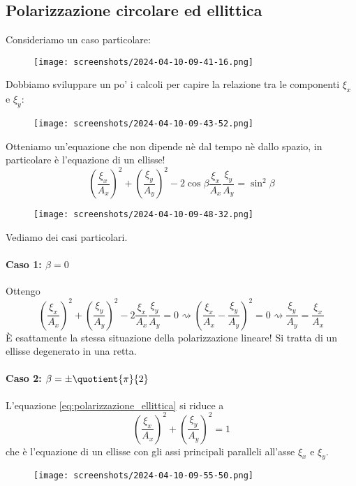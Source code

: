 \subsection{Polarizzazione circolare ed ellittica}
Consideriamo un caso particolare:
\begin{figure}[H]
	\centering
	\texttt{[image: screenshots/2024-04-10-09-41-16.png]}
\end{figure}
Dobbiamo sviluppare un po' i calcoli per capire la relazione tra le componenti \(\xi _x\) e \(\xi _y\):
\begin{figure}[H]
	\centering
	\texttt{[image: screenshots/2024-04-10-09-43-52.png]}
\end{figure}
Otteniamo un'equazione che non dipende nè dal tempo nè dallo spazio, in particolare è l'equazione di un ellisse!
\begin{equation}\label{eq:polarizzazione_ellittica}
	\left( \frac{\xi _x}{A_x} \right)^{2} +\left( \frac{\xi _y}{A_y} \right)^{2} -2 \cos \beta \frac{\xi _x}{A_x} \frac{\xi _y}{A_y} = \sin ^{2} \beta   
\end{equation}
\begin{figure}[H]
	\centering
	\texttt{[image: screenshots/2024-04-10-09-48-32.png]}
\end{figure}
Vediamo dei casi particolari.

\paragraph{Caso 1: \(\beta =0\)}
Ottengo
\begin{equation}
	\left( \frac{\xi _x}{A_x} \right)^{2} + \left( \frac{\xi _y}{A_y} \right)^{2} -2 \frac{\xi _x}{A_x}\frac{\xi _y}{A_y}=0 \rightsquigarrow 
	\left( \frac{\xi _x}{A_x}- \frac{\xi _y}{A_y} \right)^{2} =0 \rightsquigarrow 
	\frac{\xi _y}{A_y}=\frac{\xi _x}{A_x}   
\end{equation}
È esattamente la stessa situazione della polarizzazione lineare! Si tratta di un ellisse degenerato in una retta.

\paragraph{Caso 2: \(\beta = \pm \quotient{\pi }{2} \)}
L'equazione \eqref{eq:polarizzazione_ellittica} si riduce a
\begin{equation}
	\left( \frac{\xi _x}{A_x} \right)^{2} + \left( \frac{\xi _y}{A_y} \right)^{2} =1  
\end{equation} 
che è l'equazione di un ellisse con gli assi principali paralleli all'asse \(\xi _x\) e \(\xi _y\).
\begin{figure}[H]
	\centering
	\texttt{[image: screenshots/2024-04-10-09-55-50.png]}
\end{figure}

